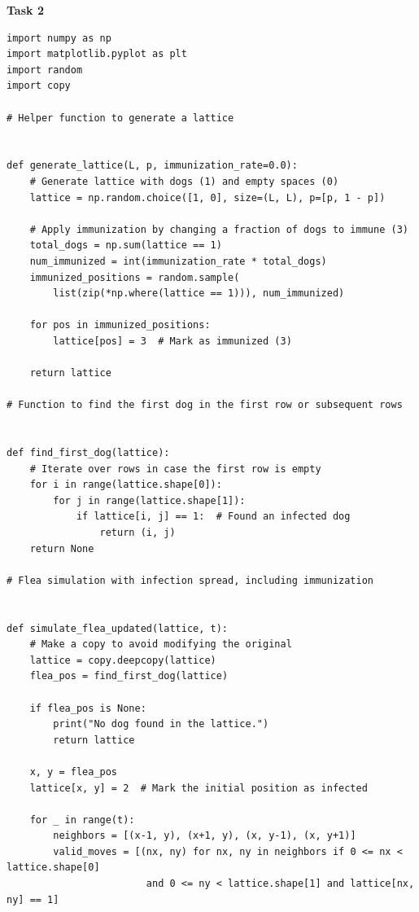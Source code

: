 \documentclass[10pt,letterpaper, onecolumn]{report}
\begin{document}
\clearpage
\begin{flushleft}
    \begin{flushleft}
        \textbf{Task 2}
        \hfill\break
        \setlength{\parindent}{1.5em} %
        \setlength{\parskip}{0.5em}   %


        \begin{lstlisting}[style=myPythonStyle, caption={Flea on the very left dog}]
import numpy as np
import matplotlib.pyplot as plt
import random
import copy

# Helper function to generate a lattice


def generate_lattice(L, p, immunization_rate=0.0):
    # Generate lattice with dogs (1) and empty spaces (0)
    lattice = np.random.choice([1, 0], size=(L, L), p=[p, 1 - p])

    # Apply immunization by changing a fraction of dogs to immune (3)
    total_dogs = np.sum(lattice == 1)
    num_immunized = int(immunization_rate * total_dogs)
    immunized_positions = random.sample(
        list(zip(*np.where(lattice == 1))), num_immunized)

    for pos in immunized_positions:
        lattice[pos] = 3  # Mark as immunized (3)

    return lattice

# Function to find the first dog in the first row or subsequent rows


def find_first_dog(lattice):
    # Iterate over rows in case the first row is empty
    for i in range(lattice.shape[0]):
        for j in range(lattice.shape[1]):
            if lattice[i, j] == 1:  # Found an infected dog
                return (i, j)
    return None

# Flea simulation with infection spread, including immunization


def simulate_flea_updated(lattice, t):
    # Make a copy to avoid modifying the original
    lattice = copy.deepcopy(lattice)
    flea_pos = find_first_dog(lattice)

    if flea_pos is None:
        print("No dog found in the lattice.")
        return lattice

    x, y = flea_pos
    lattice[x, y] = 2  # Mark the initial position as infected

    for _ in range(t):
        neighbors = [(x-1, y), (x+1, y), (x, y-1), (x, y+1)]
        valid_moves = [(nx, ny) for nx, ny in neighbors if 0 <= nx < lattice.shape[0]
                        and 0 <= ny < lattice.shape[1] and lattice[nx, ny] == 1]


\end{lstlisting}
\end{flushleft}
\end{flushleft}
\end{document}
